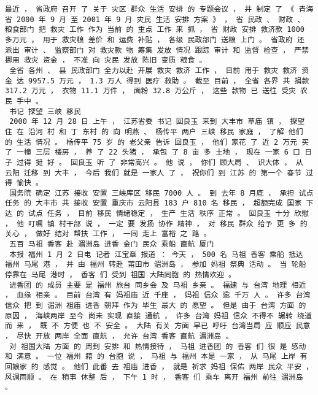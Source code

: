 \documentclass{article}
\begin{document}
\begin{Verbatim}[commandchars=\\\{\}]
 最近 ， 省政府 召开 了 关于 灾区 群众 生活 安排 的 专题会议 ， 并 制定 了 《 青海省 2000 年 9 月 至 2001 年 9 月 灾民 生活 安排 方案 》 ， 省 民政 、 财政 、 粮食部门 把 救灾 工作 作为 当前 的 重点 工作 来 抓 ， 省 财政 安排 救济款 1000 多万元 ， 用于 救灾粮 差价 和 运费 补贴 ， 各级 民政部门 送粮 上门 。 省政府 还 派出 审计 、 监察部门 对 救灾款 物 筹集 发放 情况 跟踪 审计 和 监督 检查 ， 严禁 挪用 救灾 资金 ， 不准 向 灾民 发放 陈旧 变质 粮食 。 
 全省 各州 、 县 民政部门 全力以赴 开展 救灾 救济 工作 ， 目前 用于 救灾 救济 资金 达 9957.5 万元 ， 1.3 万人 得到 医疗 救助 。 截至 目前 ， 全省 各界 共 捐款 317.2 万元 ， 衣物 11.1 万件 ， 面粉 32.8 万公斤 ， 这些 款物 已 送往 受灾 农民 手中 。 
 书记 探望 三峡 移民 
 2000 年 12 月 28 日 上午 ， 江苏省委 书记 回良玉 来到 大丰市 草庙 镇 ， 探望 住 在 沿河 村 和 丁 东村 的 向 明燕 、 杨传平 两户 三峡 移民 家庭 ， 了解 他们 的 生活 情况 。 杨传平 75 岁 的 老父亲 告诉 回良玉 ， 他们 家花 了 近 2 万元 买 了 一幢 三层 楼房 ， 养 了 22 头猪 ， 承包 了 8 亩 多 土地 ， 现在 一家 6 口 日子 过得 挺 好 。 回良玉 听 了 非常高兴 。 他 说 ， 你们 顾大局 、 识大体 ， 从 云阳 迁移 到 大丰 ， 今后 我们 就是 一家人 了 ， 祝你们 到 江苏 的 第一个 春节 过得 愉快 。 
 国务院 确定 江苏 接收 安置 三峡库区 移民 7000 人 。 到 去年 8 月底 ， 承担 试点 任务 的 大丰市 共 接收 安置 重庆市 云阳县 183 户 810 名 移民 ， 超额完成 国家 下达 的 试点 任务 ， 目前 移民 情绪稳定 ， 生产 生活 秩序 正常 。 回良玉 十分 欣慰 ， 他 叮嘱 镇 村干部 说 ， 一定 要 发扬 协作 精神 ， 对 移民 群众 给予 更 多 的 关心 ， 做好 结对 帮扶 工作 ， 一同 走上 富裕 之 路 。 
 五百 马祖 香客 赴 湄洲岛 进香 金门 民众 乘船 直航 厦门 
 本报 福州 1 月 2 日电 记者 江宝章 报道 ： 今天 ， 500 名 马祖 香客 乘船 抵达 福州 马尾 港 ， 并 由 福州 转赴 莆田市 湄洲岛 ， 参加 妈祖 祭典 活动 。 当 轮船 停靠在 马尾 港时 ， 香客 们 受到 祖国 大陆同胞 的 热情欢迎 。 
 进香团 的 成员 主要 是 福州 旅台 同乡会 及 马祖 乡亲 。 福建 与 台湾 地理 相近 ， 血缘 相亲 。 目前 台湾 有 妈祖庙 近 千座 ， 妈祖 信众 逾 千万 人 。 许多 台湾 信众 把 到 湄洲 祖庙 进香 朝拜 作为 毕生 最大 的 愿望 。 但是 由于 台湾 方面 的 原因 ， 海峡两岸 至今 尚未 实现 直接 通航 ， 许多 台湾 妈祖 信众 不得不 辗转 绕道 而 来 ， 既 不 方便 也 不 安全 。 大陆 有关 方面 早已 呼吁 台湾当局 应 顺应 民意 ， 尽快 开放 两岸 全面 直航 ， 允许 台湾 香客 直航 湄洲岛 。 
 对 祖国大陆 方面 的 周到 安排 和 热情接待 ， 马祖 进香团 的 香客 们 很 是 感动 和 满意 。 一位 福州 籍 的 台胞 说 ， 马祖 与 福州 本是 一家 ， 从 马尾 上岸 有 回娘家 的 感觉 。 他们 此番 去 祖庙 进香 ， 就是 祈求 妈祖 保佑 两岸 民众 平安 ， 风调雨顺 。 在 稍事 休整 后 ， 下午 1 时 ， 香客 们 乘车 离开 福州 前往 湄洲岛 。 

\end{Verbatim}
\end{document}
